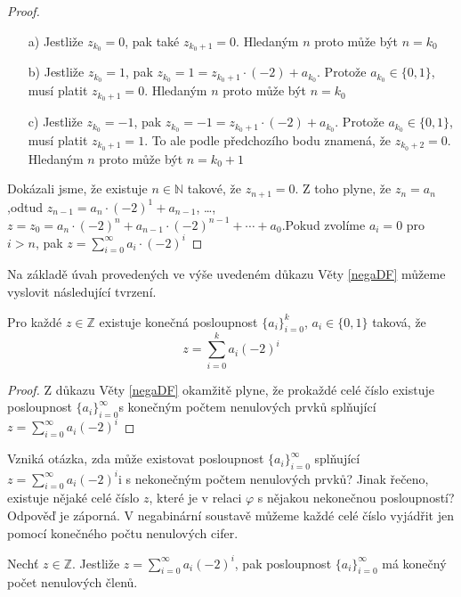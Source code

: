 \documentclass[czech,bachelor,dept470,male]{diploma}
\newcommand{\posla}{\{a_i\}_{i=0}^{\infty}}
\begin{document}
\begin{proof}
	\begin{enumerate}
		\item[a)] Jestliže $z_{k_0} = 0$, pak také $z_{k_0+1} = 0$. Hledaným $n$ proto může být $n = k_0$
		\item[b)] Jestliže $z_{k_0} = 1$, pak $z_{k_0} = 1 = z_{k_0+1}\cdot(-2)+a_{k_0}$. Protože $a_{k_0} \in \{0,1\}$,
		      musí platit $z_{k_0+1}=0$. Hledaným $n$ proto může být $n = k_0$
		\item[c)] Jestliže $z_{k_0} = -1$, pak $z_{k_0} = -1 = z_{k_0+1}\cdot(-2)+a_{k_0}$. Protože $a_{k_0} \in
			      \{0,1\}$, musí platit $z_{k_0+1}=1$. To ale podle předchozího bodu znamená, že $z_{k_0+2}=0$. Hledaným $n$ proto může být $n = k_0 + 1$
	\end{enumerate}
	Dokázali jsme, že existuje $n \in \mathbb{N}$ takové, že $z_{n+1} = 0$. Z toho plyne, že $z_n = a_n$,\newline odtud $z_{n-1} = a_n\cdot(-2)^1 + a_{n-1}$, \dots, $z = z_0 = a_n\cdot(-2)^n + a_{n-1}\cdot(-2)^{n-1} + \cdots + a_0$.\newline Pokud zvolíme $a_i = 0$ pro $i > n$, pak $z=\sum_{i=0}^{\infty}a_i\cdot(-2)^i$
\end{proof}
Na základě úvah provedených ve výše uvedeném důkazu Věty \ref{negaDF} můžeme vyslovit následující tvrzení.
\begin{theorem}\label{NBv2}
	Pro každé $z \in \mathbb{Z}$ existuje konečná posloupnost $\{a_i\}_{i=0}^k$, $a_i \in \{0, 1\}$ taková, že
	$$
		z = \sum_{i=0}^{k}a_i(-2)^i
	$$
\end{theorem}
\begin{proof}
	Z důkazu Věty \ref{negaDF} okamžitě plyne, že prokaždé celé číslo existuje posloupnost $\posla$\newline s konečným počtem nenulových prvků splňující $z=\sum_{i=0}^{\infty}a_i(-2)^i$
\end{proof}
Vzniká otázka, zda může existovat posloupnost $\posla$ splňující $z=\sum_{i=0}^{\infty}a_i(-2)^i$\newline i s nekonečným počtem nenulových prvků? Jinak řečeno, existuje nějaké celé číslo $z$, které je v relaci $\varphi$ s nějakou nekonečnou posloupností? Odpověď je záporná. V negabinární soustavě můžeme každé celé číslo vyjádřit jen pomocí konečného počtu nenulových cifer.
\newpage
\begin{theorem}\label{NBv2.5}
	Nechť $z \in \mathbb{Z}$. Jestliže $z=\sum_{i=0}^{\infty}a_i(-2)^i$, pak posloupnost $\posla$ má konečný počet nenulových členů.
\end{theorem}
\end{document}
